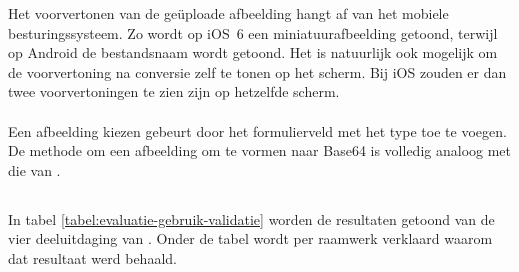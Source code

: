 Het voorvertonen van de geüploade afbeelding hangt af van het mobiele besturingssysteem.
Zo wordt op iOS~6 een miniatuurafbeelding getoond, terwijl op Android de bestandsnaam wordt getoond.
Het is natuurlijk ook mogelijk om de voorvertoning na conversie zelf te tonen op het scherm.
Bij iOS zouden er dan twee voorvertoningen te zien zijn op hetzelfde scherm.

\paragraph{\lungo}
Een afbeelding kiezen gebeurt door het formulierveld met het type  toe te voegen.
De methode om een afbeelding om te vormen naar Base64 is volledig analoog met die van \kendo{}.


\subsection{}
\label{sec:evaluatie-gebruik-validatie}

In tabel \ref{tabel:evaluatie-gebruik-validatie} worden de resultaten getoond van de vier deeluitdaging van .
Onder de tabel wordt per raamwerk verklaard waarom dat resultaat werd behaald.


\begin{table}[H]
\centering
{}
\caption{Gebruik van  voor \st{}~(\sta), \kendo{}~(\kendoa), \jqm{}~(\jqma) en \lungo{}~(\lungoa).}
\label{tabel:evaluatie-gebruik-validatie}
\end{table}


